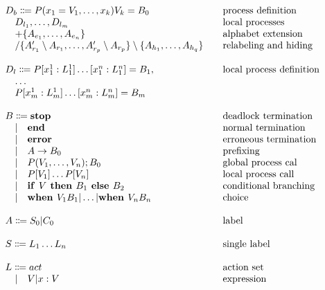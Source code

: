 \newenvironment{grammar}[2]
{\begin{tabular}{@{}>{$}l<{$}@{\qquad}l@{}}
		\multicolumn{1}{@{}l@{}}{$#1$}&\multicolumn{1}{l@{}}{#2}\\}
	{\end{tabular}}
\begin{figure}[H]
\[
\begin{grammar}{}{}
	D_b \Coloneqq P(x_1=V_1,\ldots,x_k)V_k=B_0 &process definition\\
	\quad D_{l_1},\ldots,D_{l_m}                        & local processes \\
	\quad +\{A_{e_1}, \ldots,A_{e_n} \}                           & alphabet extension \\
	\quad / \{A'_{r_1}\setminus A_{r_1},\ldots, A'_{r_p}\setminus A_{r_p} \} \setminus \{ A_{h_1},\ldots, A_{h_q} \}                         & relabeling and hiding \\
	\\
	D_l \Coloneqq P[x_1^1:L_1^1]\ldots[x_1^n:L_1^n]=B_1, &local process definition\\
	\quad \ldots                        &  \\
	\quad P[x_m^1:L_m^1]\ldots[x_m^n:L_m^n]=B_m &\\
	\\
	B \Coloneqq \text{\textbf{stop}} &deadlock termination\\
	\quad |\quad  \text{\textbf{end}} &normal termination\\
	\quad |\quad  \text{\textbf{error}} &erroneous termination\\
	\quad |\quad  A \rightarrow B_0 &prefixing\\	
	\quad |\quad  P(V_1,\ldots, V_n);B_0 &global process cal\\		
	\quad |\quad  P[V_1]\ldots P[V_n] &local process call\\	
	\quad |\quad  \text{\textbf{if }} V \text{\textbf{ then }} B_1 \text{\textbf{ else }} B_2&conditional branching\\
	\quad |\quad  \text{\textbf{when }} V_1 B_1 | \ldots | \text{\textbf{when }} V_n B_n &choice\\	
	\\
	A \Coloneqq S_0 | C_0 &label\\	
	\\
	S \Coloneqq L_1 \ldots L_n &single label\\	
	\\
	L \Coloneqq act &action set\\		
	\quad |\quad  V | x:V &expression\\	

\end{grammar}\]
\end{figure}
